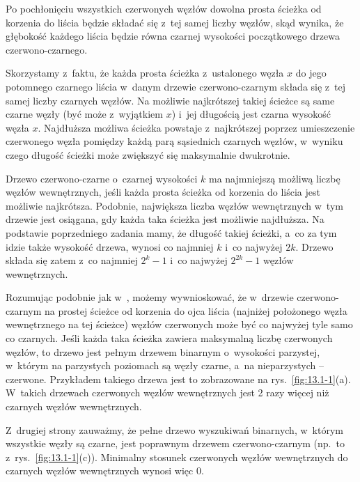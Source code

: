 Po pochłonięciu wszystkich czerwonych węzłów dowolna prosta ścieżka od korzenia do liścia będzie składać się z~tej samej liczby węzłów, skąd wynika, że głębokość każdego liścia będzie równa czarnej wysokości początkowego drzewa czerwono-czarnego.

\exercise %
Skorzystamy z~faktu, że każda prosta ścieżka z~ustalonego węzła $x$ do jego potomnego czarnego liścia w~danym drzewie czerwono-czarnym składa się z~tej samej liczby czarnych węzłów.
Na możliwie najkrótszej takiej ścieżce są same czarne węzły (być może z~wyjątkiem $x$) i~jej długością jest czarna wysokość węzła $x$.
Najdłuższa możliwa ścieżka powstaje z~najkrótszej poprzez umieszczenie czerwonego węzła pomiędzy każdą parą sąsiednich czarnych węzłów, w~wyniku czego długość ścieżki może zwiększyć się maksymalnie dwukrotnie.

\exercise %
Drzewo czerwono-czarne o~czarnej wysokości $k$ ma najmniejszą możliwą liczbę węzłów wewnętrznych, jeśli każda prosta ścieżka od korzenia do liścia jest możliwie najkrótsza.
Podobnie, największa liczba węzłów wewnętrznych w~tym drzewie jest osiągana, gdy każda taka ścieżka jest możliwie najdłuższa.
Na podstawie poprzedniego zadania mamy, że długość takiej ścieżki, a~co za tym idzie także wysokość drzewa, wynosi co najmniej $k$ i~co najwyżej $2k$.
Drzewo składa się zatem z~co najmniej $2^k-1$ i~co najwyżej $2^{2k}-1$ węzłów wewnętrznych.

\exercise %
Rozumując podobnie jak w~, możemy wywnioskować, że w~drzewie czerwono-czarnym na prostej ścieżce od korzenia do ojca liścia (najniżej położonego węzła wewnętrznego na tej ścieżce) węzłów czerwonych może być co najwyżej tyle samo co czarnych.
Jeśli każda taka ścieżka zawiera maksymalną liczbę czerwonych węzłów, to drzewo jest pełnym drzewem binarnym o~wysokości parzystej, w~którym na parzystych poziomach są węzły czarne, a~na nieparzystych -- czerwone.
Przykładem takiego drzewa jest to zobrazowane na rys.\ \ref{fig:13.1-1}(a).
W~takich drzewach czerwonych węzłów wewnętrznych jest 2 razy więcej niż czarnych węzłów wewnętrznych.

Z~drugiej strony zauważmy, że pełne drzewo wyszukiwań binarnych, w~którym wszystkie węzły są czarne, jest poprawnym drzewem czerwono-czarnym (np.\ to z~rys.\ \ref{fig:13.1-1}(c)).
Minimalny stosunek czerwonych węzłów wewnętrznych do czarnych węzłów wewnętrznych wynosi więc 0.
